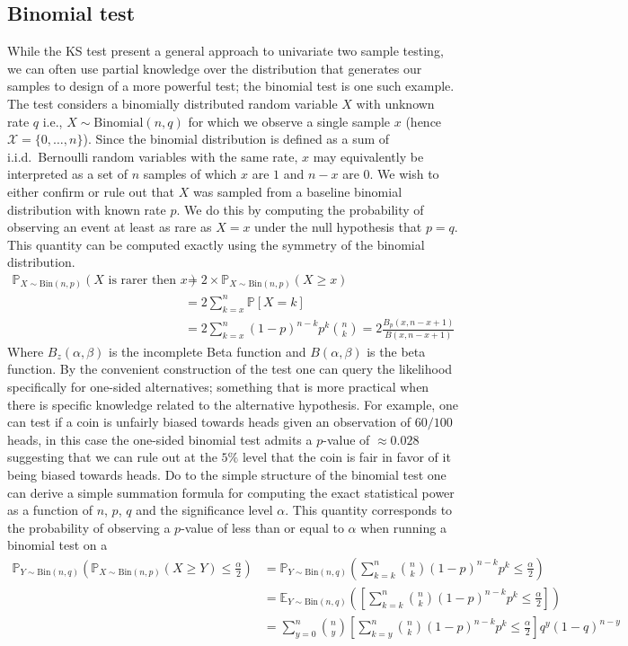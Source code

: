 \subsection*{Binomial test} While the KS test present a general approach to univariate two sample testing, we can often use partial knowledge over the distribution that generates our samples to design of a more powerful test;
the binomial test is one such example.
The test considers a binomially distributed random variable $X$ with unknown rate $q$ i.e., $X\sim \text{Binomial}(n, q)$ for which we observe a single sample $x$ (hence $\mathcal{X}=\{0,\ldots, n\}$).
Since the binomial distribution is defined as a sum of i.i.d.\ Bernoulli random variables with the same rate, $x$ may equivalently be interpreted as a set of $n$ samples of which $x$ are $1$ and $n-x$ are $0$.
We wish to either confirm or rule out that $X$ was sampled from a baseline binomial distribution with known rate $p$.
We do this by computing the probability of observing an event at least as rare as $X=x$ under the null hypothesis that $p=q$.
This quantity can be computed exactly using the symmetry of the binomial distribution.
\begin{align*}
    \mathbb{P}_{X\sim \text{Bin}(n, p)}(X \text{ is rarer then } x) &= 2\times \mathbb{P}_{X\sim \text{Bin}(n, p)}(X \geq x)\\
    &= 2 \sum_{k=x}^{n} \mathbb{P}[X=k] \\
    &= 2 \sum _{k=x}^n (1-p)^{n-k} p^k \binom{n}{k} = 2\frac{B_p(x,n-x+1)}{B(x,n-x+1)}
\end{align*}
Where $B_z(\alpha, \beta)$ is the incomplete Beta function and $B(\alpha, \beta)$ is the beta function.
By the convenient construction of the test one can query the likelihood specifically for one-sided alternatives;
something that is more practical when there is specific knowledge related to the alternative hypothesis.
For example, one can test if a coin is unfairly biased towards heads given an observation of $60/100$ heads, in this case the one-sided binomial test admits a $p$-value of $\approx 0.028$ suggesting that we can rule out at the $5\%$ level that the coin is fair
in favor of it being biased towards heads.
\smallbreak
Do to the simple structure of the binomial test one can derive a simple summation formula for computing the
exact statistical power as a function of $n$, $p$, $q$ and the significance level $\alpha$.
This quantity corresponds to the probability of observing a $p$-value of less than or equal to $\alpha$ when running a
binomial test on a
\begin{align*}
    \mathbb{P}_{Y\sim \text{Bin}(n, q)} \left( \mathbb{P}_{X\sim \text{Bin}(n, p)}(X \geq Y) \leq \frac{\alpha}{2} \right)&= \mathbb{P}_{Y\sim \text{Bin}(n, q)}\left(  \sum_{k=k}^n \binom{n}{k} (1-p)^{n-k} p^k  \leq \frac{\alpha}{2} \right)\\
    &= \mathbb{E}_{Y\sim \text{Bin}(n, q)}\left(  \left[\sum_{k=k}^n \binom{n}{k} (1-p)^{n-k} p^k  \leq \frac{\alpha}{2}\right] \right)\\
    &= \sum_{y=0}^n \binom{n}{y} \left[  \sum_{k=y}^n \binom{n}{k} (1-p)^{n-k} p^k \leq \frac{\alpha}{2} \right] q^y (1-q)^{n-y}
\end{align*}
